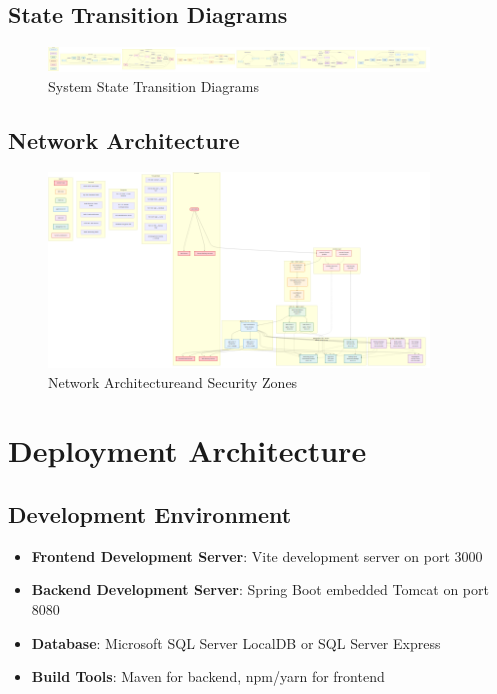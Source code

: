 \documentclass[12pt,a4paper]{article}
\begin{document}
\subsection{State Transition Diagrams}

\begin{figure}[H]
\centering
\includegraphics[width=0.9\textwidth]{diagrams/state_transition_diagram.png}
\caption{System State Transition Diagrams}
\label{fig:state-transition-diagram}
\end{figure}

\subsection{Network Architecture}

\begin{figure}[H]
\centering
\includegraphics[width=0.9\textwidth]{diagrams/network_architecture.png}
\caption{Network Architectureand Security Zones}
\label{fig:component-diagram}
\end{figure}

\section{Deployment Architecture}

\subsection{Development Environment}

\begin{itemize}
\item \textbf{Frontend Development Server}: Vite development server on port 3000
\item \textbf{Backend Development Server}: Spring Boot embedded Tomcat on port 8080
\item \textbf{Database}: Microsoft SQL Server LocalDB or SQL Server Express
\item \textbf{Build Tools}: Maven for backend, npm/yarn for frontend
\end{itemize}
\end{document}
